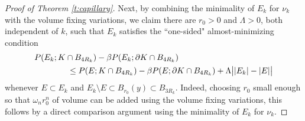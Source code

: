 \documentclass[10pt,reqno]{amsart}
\numberwithin{equation}{section}
\theoremstyle{definition}
\begin{document}
{{\begin{proof}[Proof of Theorem \ref{t:capillary}]
Next, by combining the minimality of $E_k$ for $\nu_k$ with the volume fixing variations, we claim there are $r_0>0$ and $\Lambda>0$, both independent of $k$, such that $E_k$ satisfies the ``one-sided" almost-minimizing condition
\begin{align}\notag 
    &P(E_k;K \cap B_{4R_k}) - \beta P(E_k;\partial K\cap B_{4R_k}) \\ \label{eq:almost cap minimality}
    &\qquad \qquad \leq P(E;K\cap B_{4R_k})- \beta P(E;\partial K\cap B_{4R_k}) + \Lambda\big||E_k| -|E|\big|
\end{align}
whenever $E\subset E_k$ and $E_k \setminus E \subset B_{r_0}(y)\subset B_{3R_k}$. Indeed, choosing $r_0$ small enough so that $\omega_nr_0^n$ of volume can be added using the volume fixing variations, this follows by a direct comparison argument using the minimality of $E_k$ for $\nu_k$. 

\medskip


\end{proof}}}
\end{document}
